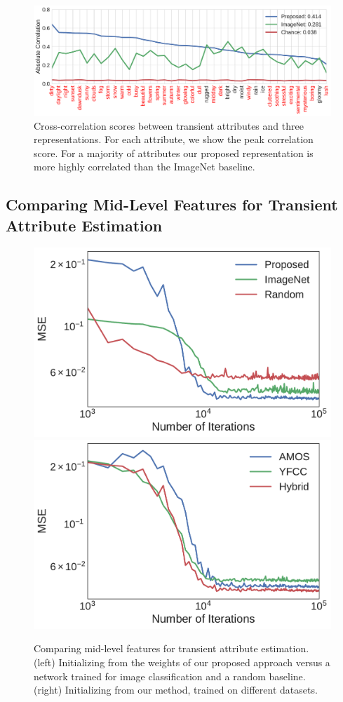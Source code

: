\documentclass{bmvc2k}
\newcommand{\figlab}[1]{\label{fig:#1}}
\begin{document}
\begin{figure}
  \centering
  
  \includegraphics[width=\columnwidth]{correlation/hybrid} 
  
  \caption{Cross-correlation scores between transient attributes and
  three representations. For each attribute, we show the peak
  correlation score. For a majority of attributes our proposed
  representation is more highly correlated than the ImageNet
  baseline.}
  
  \figlab{correlation}
\end{figure}


\subsection{Comparing Mid-Level Features for Transient Attribute Estimation}

\begin{figure}
  \centering
  
  \includegraphics[width=.47\columnwidth]{pretrain/mse_inter}
  \includegraphics[width=.47\columnwidth]{pretrain/mse_intra}
  
  \caption{Comparing mid-level features for transient attribute
  estimation. (left) Initializing from the weights of our proposed
  approach versus a network trained for image classification and a
  random baseline. (right) Initializing from our method, trained on
  different datasets.}
  
  \label{fig:pretrain}
\end{figure}
\end{document}
